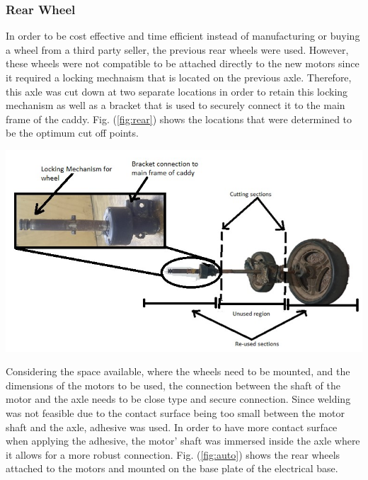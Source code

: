 \documentclass[11pt,landscape]{article}
\newenvironment{Figure}
  {\par\medskip\noindent\minipage{\linewidth}}
  {\endminipage\par\medskip}
\begin{document}
\begin{multicols}{2}
\subsubsection{Rear Wheel}
In order to be cost effective and time efficient instead of manufacturing or
buying a wheel from a third party seller, the previous rear wheels were
used. However, these wheels were not compatible to be attached directly to
the new motors since it required a locking mechnaism that is located on the
previous axle. Therefore, this axle was cut down at two separate locations
in order to retain this locking mechanism as well as a bracket that is used
to securely connect it to the main frame of the caddy. Fig. (\ref{fig:rear})
shows the locations that were determined to be the optimum cut off points.

\begin{Figure}
    \begin{center}
        \includegraphics[width=\textwidth]{Figure26.jpg}
        \label{fig:rear}
    \end{center}
\end{Figure}

Considering the space available, where the wheels need to be mounted, and
the dimensions of the motors to be used, the connection between the shaft of
the motor and the axle needs to be close type and secure connection. Since
welding was not feasible due to the contact surface being too small between
the motor shaft and the axle, adhesive was used. In order to have more
contact surface when applying the adhesive, the motor’ shaft was immersed
inside the axle where it allows for a more robust connection. Fig.
(\ref{fig:auto}) shows the rear wheels attached to the motors and mounted on
the base plate of the electrical base.


\end{multicols}
\end{document}
